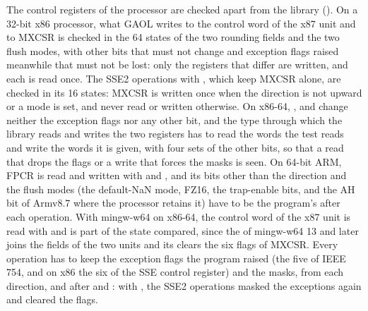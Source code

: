 \documentclass[12pt,a4paper,twoside,openright]{book}
\begin{document}
\medskip
The control registers of the processor are checked apart from the library
(). On a 32-bit x86 processor, what GAOL
writes to the control word of the x87 unit and to MXCSR is checked in the 64
states of the two rounding fields and the two flush modes, with other bits
that must not change and exception flags raised meanwhile that must not be
lost: only the registers that differ are written, and each is read once. The
SSE2 operations with , which keep MXCSR
alone, are checked in its 16 states: MXCSR is written once when the
direction is not upward or a mode is set, and never read or written
otherwise. On x86-64, ,  and
 change neither the exception flags
nor any other bit, and the type through which the library reads and writes
the two registers has to read the words the test reads and write the words
it is given, with four sets of the other bits, so that a read that drops the
flags or a write that forces the masks is seen. On 64-bit ARM, FPCR is read
and written with  and , and its bits other than the
direction and the flush modes (the default-NaN mode, FZ16, the trap-enable
bits, and the AH bit of Armv8.7 where the processor retains it) have to be
the program's after each operation.\newinvfive{} With mingw-w64 on x86-64,
the control word of the x87 unit is read with  and is part of
the state compared, since the  of mingw-w64 13 and later
joins the fields of the two units and its  clears the six
flags of MXCSR. Every operation has to keep the exception flags the program
raised (the five of IEEE 754, and on x86 the six of the SSE control
register) and the masks, from each direction, and after
 and : with
, the SSE2 operations masked the exceptions
again and cleared the flags.\newinvfive
\end{document}
